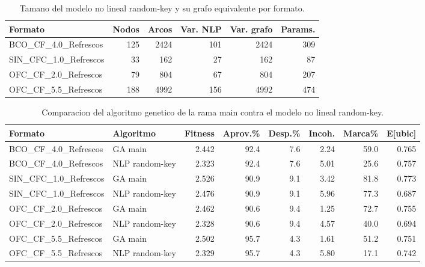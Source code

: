 \begin{table}[h]
\centering
\small
\renewcommand{\arraystretch}{1.18}
\begin{tabular}{lrrrrr}
\toprule
\textbf{Formato} & \textbf{Nodos} & \textbf{Arcos} & \textbf{Var. NLP} & \textbf{Var. grafo} & \textbf{Params.} \\
\midrule
BCO\_CF\_4.0\_Refrescos & 125 & 2424 & 101 & 2424 & 309 \\
SIN\_CFC\_1.0\_Refrescos & 33 & 162 & 27 & 162 & 87 \\
OFC\_CF\_2.0\_Refrescos & 79 & 804 & 67 & 804 & 207 \\
OFC\_CF\_5.5\_Refrescos & 188 & 4992 & 156 & 4992 & 474 \\
\bottomrule
\end{tabular}
\caption{Tamano del modelo no lineal random-key y su grafo equivalente por formato.}
\end{table}

\begin{table}[h]
\centering
\small
\renewcommand{\arraystretch}{1.18}
\begin{tabular}{llrrrrrr}
\toprule
\textbf{Formato} & \textbf{Algoritmo} & \textbf{Fitness} & \textbf{Aprov.\%} & \textbf{Desp.\%} & \textbf{Incoh.} & \textbf{Marca\%} & \textbf{E[ubic]} \\
\midrule
BCO\_CF\_4.0\_Refrescos & GA main & 2.442 & 92.4 & 7.6 & 2.24 & 59.0 & 0.765 \\
BCO\_CF\_4.0\_Refrescos & NLP random-key & 2.323 & 92.4 & 7.6 & 5.01 & 25.6 & 0.757 \\
SIN\_CFC\_1.0\_Refrescos & GA main & 2.526 & 90.9 & 9.1 & 3.42 & 81.8 & 0.773 \\
SIN\_CFC\_1.0\_Refrescos & NLP random-key & 2.476 & 90.9 & 9.1 & 5.96 & 77.3 & 0.687 \\
OFC\_CF\_2.0\_Refrescos & GA main & 2.462 & 90.6 & 9.4 & 1.25 & 72.7 & 0.755 \\
OFC\_CF\_2.0\_Refrescos & NLP random-key & 2.328 & 90.6 & 9.4 & 4.57 & 40.0 & 0.694 \\
OFC\_CF\_5.5\_Refrescos & GA main & 2.502 & 95.7 & 4.3 & 1.61 & 51.2 & 0.751 \\
OFC\_CF\_5.5\_Refrescos & NLP random-key & 2.329 & 95.7 & 4.3 & 5.80 & 17.1 & 0.742 \\
\bottomrule
\end{tabular}
\caption{Comparacion del algoritmo genetico de la rama main contra el modelo no lineal random-key.}
\end{table}

